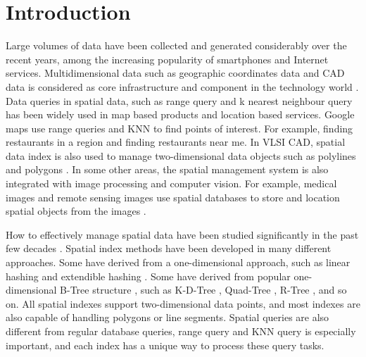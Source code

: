 \chapter{Introduction}

Large volumes of data have been collected and generated considerably over the recent years, among the increasing popularity of smartphones and Internet services. Multidimensional data such as geographic coordinates data and CAD data is considered as core infrastructure and component in the technology world \cite{gunther1990research, morton1966computer, kriegel2003using}. Data queries in spatial data, such as range query and k nearest neighbour query has been widely used in map based products and location based services. Google maps use range queries and KNN to find points of interest. For example, finding restaurants in a region and finding restaurants near me. In VLSI CAD, spatial data index is also used to manage two-dimensional data objects such as polylines and polygons \cite{liu1994evaluation}. In some other areas, the spatial management system is also integrated with image processing and computer vision. For example, medical images and remote sensing images use spatial databases to store and location spatial objects from the images \cite{borah2004improved, adhikary1996knowledge, mantel2004matching, tagare1997medical}. 

How to effectively manage spatial data have been studied significantly in the past few decades \cite{Gaede:1998fp, ooi1990efficient}. Spatial index methods have been developed in many different approaches. Some have derived from a one-dimensional approach, such as linear hashing \cite{larson1980linear} and extendible hashing \cite{fagin1979extendible}. Some have derived from popular one-dimensional B-Tree structure \cite{Bayer:2002ds}, such as K-D-Tree \cite{Bentley:1975gn}, Quad-Tree \cite{CSUR:tm}, R-Tree \cite{Guttman:1984ka}, and so on. All spatial indexes support two-dimensional data points, and most indexes are also capable of handling polygons or line segments. Spatial queries are also different from regular database queries, range query and KNN query is especially important, and each index has a unique way to process these query tasks. 



